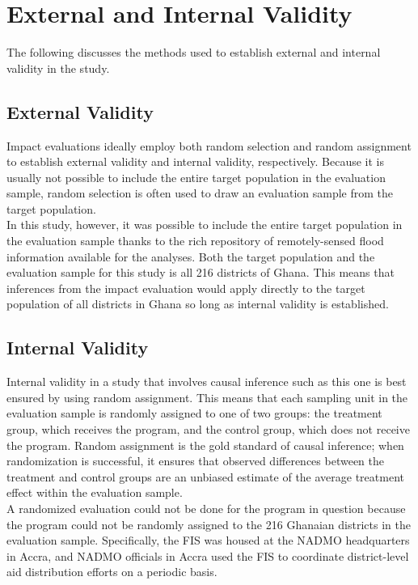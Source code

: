 \chapter{External and Internal Validity}

The following discusses the methods used to establish external and internal validity in the study.\\

\section{External Validity}

Impact evaluations ideally employ both random selection and random assignment to establish external validity and internal validity, respectively. Because it is usually not possible to include the entire target population in the evaluation sample, random selection is often used to draw an evaluation sample from the target population.\\

In this study, however, it was possible to include the entire target population in the evaluation sample thanks to the rich repository of remotely-sensed flood information available for the analyses. Both the target population and the evaluation sample for this study is all 216 districts of Ghana. This means that inferences from the impact evaluation would apply directly to the target population of all districts in Ghana so long as internal validity is established.

\section{Internal Validity}

Internal validity in a study that involves causal inference such as this one is best ensured by using random assignment. This means that each sampling unit in the evaluation sample is randomly assigned to one of two groups: the treatment group, which receives the program, and the control group, which does not receive the program. Random assignment is the gold standard of causal inference; when randomization is successful, it ensures that observed differences between the treatment and control groups are an unbiased estimate of the average treatment effect within the evaluation sample.\\

A randomized evaluation could not be done for the program in question because the program could not be randomly assigned to the 216 Ghanaian districts in the evaluation sample. Specifically, the FIS was housed at the NADMO headquarters in Accra, and NADMO officials in Accra used the FIS to coordinate district-level aid distribution efforts on a periodic basis.\\

